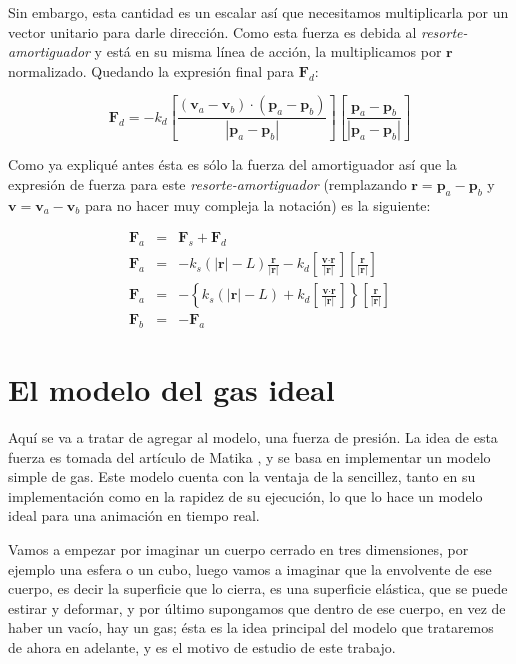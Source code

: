 Sin embargo, esta cantidad es un escalar así que necesitamos multiplicarla por un vector unitario para darle dirección.
Como esta fuerza es debida al \emph{resorte-amortiguador} y está en su misma línea de acción, la multiplicamos por $\textbf{r}$ normalizado.
Quedando la expresión final para $\textbf{F}_d$:

\begin{equation}
\textbf{F}_d = - k_d \left[ \frac{ ( \textbf{v}_a - \textbf{v}_b ) \cdot ( \textbf{p}_a - \textbf{p}_b ) } { | \textbf{p}_a - \textbf{p}_b |} \right] \left[ \frac{ \textbf{p}_a - \textbf{p}_b } { | \textbf{p}_a - \textbf{p}_b |} \right]
\end{equation}

Como ya expliqué antes ésta es sólo la fuerza del amortiguador así que la expresión de fuerza para este \emph{resorte-amortiguador} (remplazando $\textbf{r} = \textbf{p}_a - \textbf{p}_b$ y $\textbf{v} = \textbf{v}_a - \textbf{v}_b$ para no hacer muy compleja la notación) es la siguiente:

\begin{eqnarray}
\textbf{F}_a & = & \textbf{F}_s + \textbf{F}_d \nonumber \\
\textbf{F}_a & = & -k_s \left( |\textbf{r}| - L \right) \frac{\textbf{r}}{|\textbf{r}|} - k_d \left[ \frac{ \textbf{v} \cdot \textbf{r} }{ |\textbf{r}|} \right] \left[ \frac{\textbf{r}} {|\textbf{r}|}\right] \nonumber \\
\label{fuerzaResorte}
\textbf{F}_a & = & - \left\{ k_s \left( |\textbf{r}| - L \right) + k_d \left[ \frac{ \textbf{v} \cdot \textbf{r} }{ |\textbf{r}|} \right] \right\} \left[ \frac{\textbf{r}} {|\textbf{r}|} \right] \\
\textbf{F}_b & = & -\textbf{F}_a \nonumber
\end{eqnarray}

\section{El modelo del gas ideal}

Aquí se va a tratar de agregar al modelo, una fuerza de presión.
La idea de esta fuerza es tomada del artículo de Matika \cite{Matyka:Presion}, y se basa en implementar un modelo simple de gas.
Este modelo cuenta con la ventaja de la sencillez, tanto en su implementación como en la rapidez de su ejecución, lo que lo hace un modelo ideal para una animación en tiempo real.

Vamos a empezar por imaginar un cuerpo cerrado en tres dimensiones, por ejemplo una esfera o un cubo, luego vamos a imaginar que la envolvente de ese cuerpo, es decir la superficie que lo cierra, es una superficie elástica, que se puede estirar y deformar, y por último supongamos que dentro de ese cuerpo, en vez de haber un vacío, hay un gas; ésta es la idea principal del modelo que trataremos de ahora en adelante, y es el motivo de estudio de este trabajo.

